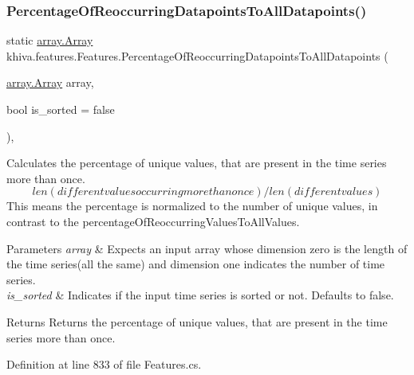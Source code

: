 \subsubsection{\texorpdfstring{Percentage\+Of\+Reoccurring\+Datapoints\+To\+All\+Datapoints()}{PercentageOfReoccurringDatapointsToAllDatapoints()}}
{\footnotesize\ttfamily static \mbox{\hyperlink{classkhiva_1_1array_1_1_array}{array.\+Array}} khiva.\+features.\+Features.\+Percentage\+Of\+Reoccurring\+Datapoints\+To\+All\+Datapoints (\begin{DoxyParamCaption}\item[{\mbox{\hyperlink{classkhiva_1_1array_1_1_array}{array.\+Array}}}]{array,  }\item[{bool}]{is\+\_\+sorted = {\ttfamily false} }\end{DoxyParamCaption})\hspace{0.3cm}{\ttfamily [inline]}, {\ttfamily [static]}}



Calculates the percentage of unique values, that are present in the time series more than once. \[ len(different values occurring more than once) / len(different values) \] This means the percentage is normalized to the number of unique values, in contrast to the percentage\+Of\+Reoccurring\+Values\+To\+All\+Values. 


\begin{DoxyParams}{Parameters}
{\em array} & Expects an input array whose dimension zero is the length of the time series(all the same) and dimension one indicates the number of time series.\\
\hline
{\em is\+\_\+sorted} & Indicates if the input time series is sorted or not. Defaults to false.\\
\hline
\end{DoxyParams}
\begin{DoxyReturn}{Returns}
Returns the percentage of unique values, that are present in the time series more than once.
\end{DoxyReturn}


Definition at line 833 of file Features.\+cs.

\mbox{\label{classkhiva_1_1features_1_1_features_a9c60a397c28bf172ab54f0293a7260d5}} 
